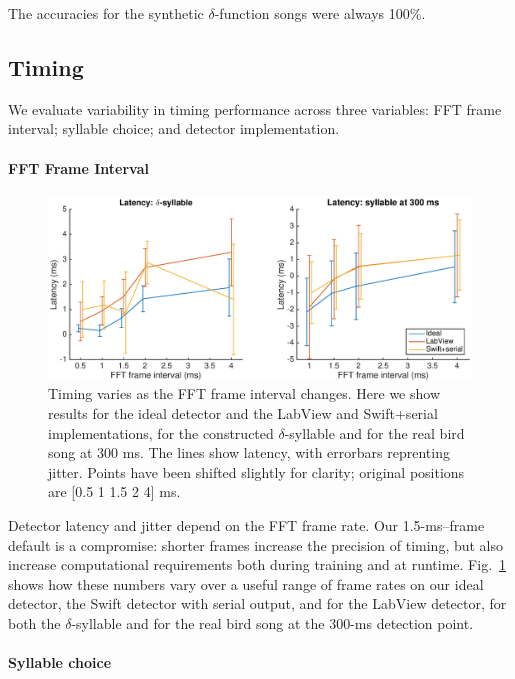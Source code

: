 \documentclass[10pt,letterpaper]{article}
\newcommand\fig[1]{Fig.~\ref{#1}}
\renewcommand{\subsubsection}[1]{\paragraph{#1}}
\begin{document}
The accuracies for the synthetic $\delta$-function songs were always 100\%.

\subsection{Timing}

We evaluate variability in timing performance across three variables: FFT frame interval; syllable choice; and detector implementation.

\subsubsection{FFT Frame Interval}

\begin{figure}
  \includegraphics[width=\textwidth]{TimingVsFrame}
  \caption{Timing varies as the FFT frame interval changes.  Here we show results for the ideal detector and the LabView and Swift+serial implementations, for the constructed $\delta$-syllable and for the real bird song at 300 ms.  The lines show latency, with errorbars reprenting jitter.  Points have been shifted slightly for clarity; original positions are [0.5 1 1.5 2 4] ms.}
  \label{fig:TimingVsFrame}
\end{figure}

Detector latency and jitter depend on the FFT frame rate.  Our 1.5-ms--frame default is a compromise: shorter frames increase the precision of timing, but also increase computational requirements both during training and at runtime.  \fig{fig:TimingVsFrame} shows how these numbers vary over a useful range of frame rates on our ideal detector, the Swift detector with serial output, and for the LabView detector, for both the $\delta$-syllable and for the real bird song at the 300-ms detection point.

\subsubsection{Syllable choice}
\end{document}
